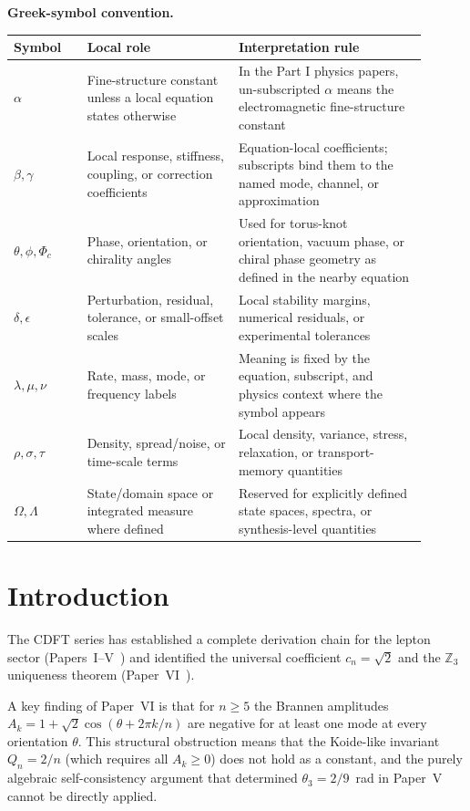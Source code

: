 \documentclass[11pt]{article}
\begin{document}
\noindent\textbf{Greek-symbol convention.}
\begin{center}
{\small
\begin{tabular}{p{0.16\linewidth}p{0.33\linewidth}p{0.41\linewidth}}
\hline
Symbol & Local role & Interpretation rule \\
\hline
$\alpha$ & Fine-structure constant unless a local equation states otherwise & In the Part I physics papers, un-subscripted $\alpha$ means the electromagnetic fine-structure constant \\
$\beta,\gamma$ & Local response, stiffness, coupling, or correction coefficients & Equation-local coefficients; subscripts bind them to the named mode, channel, or approximation \\
$\theta,\phi,\Phi_c$ & Phase, orientation, or chirality angles & Used for torus-knot orientation, vacuum phase, or chiral phase geometry as defined in the nearby equation \\
$\delta,\epsilon$ & Perturbation, residual, tolerance, or small-offset scales & Local stability margins, numerical residuals, or experimental tolerances \\
$\lambda,\mu,\nu$ & Rate, mass, mode, or frequency labels & Meaning is fixed by the equation, subscript, and physics context where the symbol appears \\
$\rho,\sigma,\tau$ & Density, spread/noise, or time-scale terms & Local density, variance, stress, relaxation, or transport-memory quantities \\
$\Omega,\Lambda$ & State/domain space or integrated measure where defined & Reserved for explicitly defined state spaces, spectra, or synthesis-level quantities \\
\hline
\end{tabular}
}
\end{center}


\section{Introduction}

The CDFT series has established a complete derivation chain for the lepton
sector (Papers~I--V~\cite{MujjabiI2026,MujjabiII2026,MujjabiIII2026,MujjabiIV2026,MujjabiV2026})
and identified the universal coefficient $c_n = \sqrt{2}$ and the
$\mathbb{Z}_3$ uniqueness theorem (Paper~VI~\cite{MujjabiVI2026}).

A key finding of Paper~VI is that for $n \geq 5$ the Brannen amplitudes
$A_k = 1 + \sqrt{2}\cos(\theta + 2\pi k/n)$ are negative for at least one
mode at every orientation $\theta$.
This structural obstruction means that the Koide-like invariant $Q_n = 2/n$
(which requires all $A_k \geq 0$) does not hold as a constant, and the
purely algebraic self-consistency argument that determined $\theta_3 = 2/9$~rad
in Paper~V cannot be directly applied.
\end{document}
